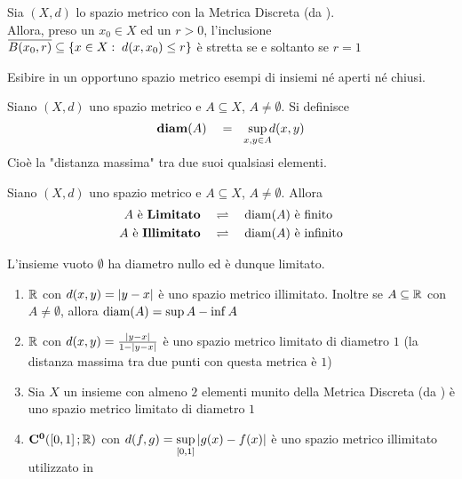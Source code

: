 \begin{proposition}
	Sia $(X,d)$ lo spazio metrico con la Metrica Discreta (da \hyperref[ex:dist_discr]{}).\\
	Allora, preso un $x_0 \in X$ ed un $r > 0$, l'inclusione $\overline{B(x_0,r)} \subseteq \left\{x \in X:\; d(x,x_0) \leq r\right\}$ è stretta se e soltanto se $r = 1$
\end{proposition}
\begin{exercise}
	Esibire in un opportuno spazio metrico esempi di insiemi né aperti né chiusi.
\end{exercise}

\begin{definition}
	Siano $(X,d)$ uno spazio metrico e $A\subseteq X$, $A \neq \emptyset$. Si definisce
	\[\boldsymbol{\diam}(A) \quad = \quad \sup\limits_{\mathclap{x,y \in A}} d(x,y)\]
	Cioè la "distanza massima" tra due suoi qualsiasi elementi.
\end{definition}
\begin{definition}
	Siano $(X,d)$ uno spazio metrico e $A\subseteq X$, $A \neq \emptyset$. Allora
	\begin{align*}
		A \text{ è \textbf{Limitato}} \quad &\rightleftharpoons \quad \operatorname{diam}(A) \text{ è finito}\\
		A \text{ è \textbf{Illimitato}} \quad &\rightleftharpoons \quad \operatorname{diam}(A) \text{ è infinito}
	\end{align*}
\end{definition}
\begin{note}
	L'insieme vuoto $\emptyset$ ha diametro nullo ed è dunque limitato.
\end{note}
\begin{example}\leavevmode\vspace*{-\baselineskip}
	\begin{enumerate}
		\item $\mathbb{R}$ con $d(x,y) = \left|y-x\right|$ è uno spazio metrico illimitato. Inoltre se $A \subseteq \mathbb{R}$ con $A \neq \emptyset$, allora $\operatorname{diam}(A) = \sup A - \inf A$
		\item $\mathbb{R}$ con $d(x,y) = \frac{\left|y-x\right|}{1-\left|y-x\right|}$ è uno spazio metrico limitato di diametro $1$ (la distanza massima tra due punti con questa metrica è $1$)
		\item Sia $X$ un insieme con almeno $2$ elementi munito della Metrica Discreta (da \hyperref[ex:dist_discr]{}) è uno spazio metrico limitato di diametro $1$ %
		\item $\mathbf{C^{0}}(\left[0,1\right]; \mathbb{R})$ con $d(f,g) = \sup\limits_{\left[0,1\right]} \left|g(x)-f(x)\right|$ è uno spazio metrico illimitato utilizzato in 
	\end{enumerate}
\end{example}
